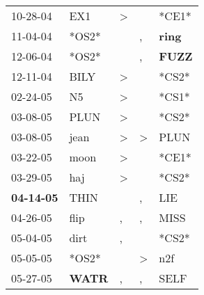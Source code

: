 \begin{supertabular}{p{0.07\textwidth}p{0.06\textwidth}p{0.02\textwidth}p{0.02\textwidth}p{0.06\textwidth}}
          10-28-04\textsuperscript{} &            EX1\textsuperscript{} &     \textgreater &                  &                            *CE1* \\
          11-04-04\textsuperscript{} &                            *OS2* &                  &                , &  \textbf{ring\textsuperscript{}} \\
          12-06-04\textsuperscript{} &                            *OS2* &                  &                , &  \textbf{FUZZ\textsuperscript{}} \\
          12-11-04\textsuperscript{} &           BILY\textsuperscript{} &     \textgreater &                  &                            *CS2* \\
          02-24-05\textsuperscript{} &             N5\textsuperscript{} &     \textgreater &                  &                            *CS1* \\
          03-08-05\textsuperscript{} &           PLUN\textsuperscript{} &     \textgreater &                  &                            *CS2* \\
          03-08-05\textsuperscript{} &           jean\textsuperscript{} &     \textgreater &     \textgreater &           PLUN\textsuperscript{} \\
          03-22-05\textsuperscript{} &           moon\textsuperscript{} &     \textgreater &                  &                            *CE1* \\
          03-29-05\textsuperscript{} &            haj\textsuperscript{} &     \textgreater &                  &                            *CS2* \\
 \textbf{04-14-05\textsuperscript{}} &           THIN\textsuperscript{} &                  &                , &            LIE\textsuperscript{} \\
          04-26-05\textsuperscript{} &           flip\textsuperscript{} &                , &                , &           MISS\textsuperscript{} \\
          05-04-05\textsuperscript{} &           dirt\textsuperscript{} &                , &                  &                            *CS2* \\
          05-05-05\textsuperscript{} &                            *OS2* &                  &     \textgreater &            n2f\textsuperscript{} \\
          05-27-05\textsuperscript{} &  \textbf{WATR\textsuperscript{}} &                , &                , &           SELF\textsuperscript{} \\

\end{supertabular}
